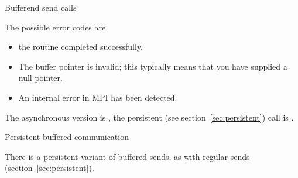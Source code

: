  {Bufferend send calls}

The possible error codes are
\begin{itemize}
\item {} the routine completed successfully.
\item {} The buffer pointer is invalid;
  this typically means that you have supplied a null pointer.
\item {} An internal error in MPI has been detected.
\end{itemize}

The asynchronous version is , the persistent
(see section~\ref{sec:persistent}) call is .

 {Persistent buffered communication}

There is a persistent variant 
of buffered sends, as with regular
sends (section~\ref{sec:persistent}).

